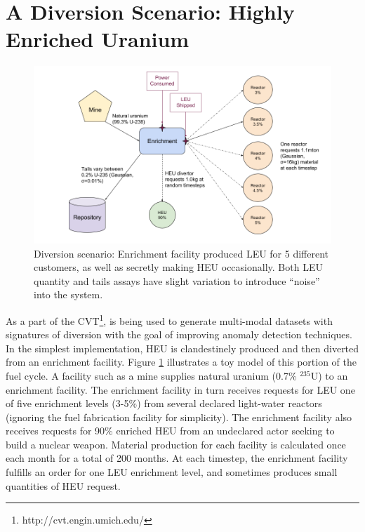 \section{A Diversion Scenario: Highly Enriched Uranium}
\label{s_results}



\begin{figure}%
\begin{center}
\includegraphics[natwidth=162bp,natheight=227bp, scale=0.4]{./figs/UM_multimodal_diagram.png}
\end{center}
\caption{Diversion scenario: Enrichment facility produced LEU for 5 different customers, as well as secretly making HEU occasionally.  Both LEU quantity and tails assays have slight variation to introduce ``noise'' into the system.}
\label{fig:scenario_layout}
\end{figure}


As a part of the \gls{CVT}\footnote{http://cvt.engin.umich.edu/}, \Cyclus is being used to generate multi-modal datasets with signatures of diversion with the goal of improving anomaly detection techniques. In the simplest implementation, \gls{HEU} is clandestinely produced and then diverted from an enrichment facility.  Figure \ref{fig:scenario_layout} illustrates a toy model of this portion of the fuel cycle. A facility such as a mine supplies natural uranium (0.7\% $^{235}$U) to an enrichment facility. The enrichment facility in turn receives requests for \gls{LEU} one of five enrichment levels (3-5\%) from several declared light-water reactors (ignoring the fuel fabrication facility for simplicity).  The enrichment facility also receives requests for 90\% enriched \gls{HEU} from an undeclared actor seeking to build a nuclear weapon. Material production for each facility is calculated once each month for a total of 200 months. At each timestep, the enrichment facility fulfills an order for one \gls{LEU} enrichment level, and sometimes produces small quantities of \gls{HEU} request. 

